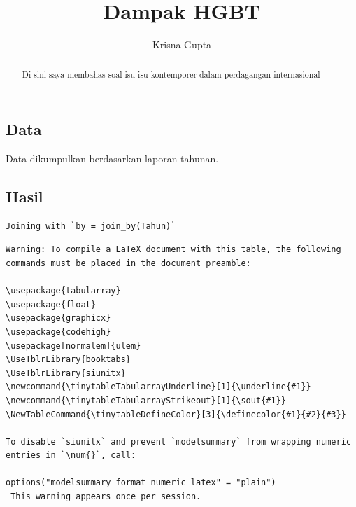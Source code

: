 \documentclass[
  letterpaper,
  DIV=11,
  numbers=noendperiod]{scrartcl}
\title{Dampak HGBT}
\author{Krisna Gupta}
\date{}
\begin{document}
\maketitle
\begin{abstract}
Di sini saya membahas soal isu-isu kontemporer dalam perdagangan
internasional
\end{abstract}


\subsection{Data}\label{data}

Data dikumpulkan berdasarkan laporan tahunan.

\subsection{Hasil}\label{hasil}

\begin{verbatim}
Joining with `by = join_by(Tahun)`
\end{verbatim}

\begin{verbatim}
Warning: To compile a LaTeX document with this table, the following commands must be placed in the document preamble:

\usepackage{tabularray}
\usepackage{float}
\usepackage{graphicx}
\usepackage{codehigh}
\usepackage[normalem]{ulem}
\UseTblrLibrary{booktabs}
\UseTblrLibrary{siunitx}
\newcommand{\tinytableTabularrayUnderline}[1]{\underline{#1}}
\newcommand{\tinytableTabularrayStrikeout}[1]{\sout{#1}}
\NewTableCommand{\tinytableDefineColor}[3]{\definecolor{#1}{#2}{#3}}

To disable `siunitx` and prevent `modelsummary` from wrapping numeric entries in `\num{}`, call:

options("modelsummary_format_numeric_latex" = "plain")
 This warning appears once per session.
\end{verbatim}
\end{document}
